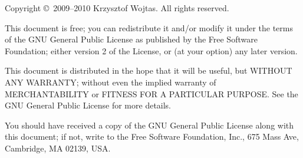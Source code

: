 \begingroup

	\newlength{\centeroffset}
	\setlength{\centeroffset}{-0.5\oddsidemargin}
	\addtolength{\centeroffset}{0.5\evensidemargin}

	\begingroup
		\sffamily
		\thispagestyle{empty}

		\noindent\hspace*{\centeroffset}


		\noindent\hspace*{\centeroffset}

		\pagebreak
	\endgroup

	\begingroup
		\setlength{\parindent}{0pt}
		\setlength{\parskip}{1ex}

		\begingroup
			\TPSwitchToEnglish
			\begin{small}
				Copyright \copyright\ 2009--2010 Krzysztof Wojtas. All rights reserved.
				
				This document is free; you can redistribute it and/or modify it under the terms of the GNU General Public License as published by the Free Software Foundation; either version 2 of the License, or (at your option) any later version.

				This document is distributed in the hope that it will be useful, but WITHOUT ANY WARRANTY; without even the implied warranty of MERCHANTABILITY or FITNESS FOR A PARTICULAR PURPOSE\@.  See the GNU General Public License for more details.

				You should have received a copy of the GNU General Public License along with this document; if not, write to the Free Software Foundation, Inc., 675 Mass Ave, Cambridge, MA 02139, USA.
			\end{small}
		\endgroup
		
